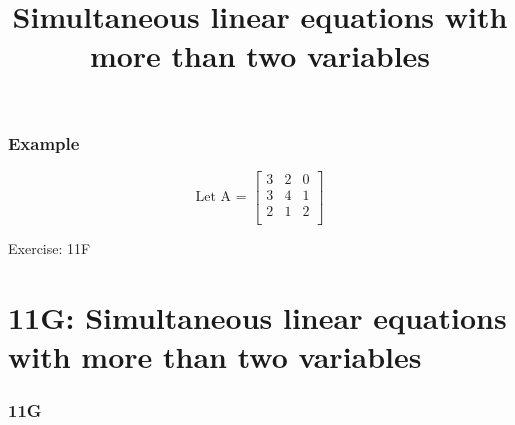 \documentclass[
	11pt, %
]{beamer}
\begin{document}
\begin{frame}    
\end{frame}
\begin{frame}[t]
    \frametitle{Example}
    \[
        \text{Let A = }
        \begin{bmatrix}
            3 & 2 & 0\\
            3 & 4 & 1\\
            2 & 1 & 2\\
        \end{bmatrix}
    \]
\end{frame}
\begin{frame}
\end{frame}
\begin{frame}{Exercise: 11F}
\end{frame}
\section{11G: Simultaneous linear equations with more than two variables}
\begin{frame}
    \frametitle{11G}
    \begin{center}
        \title{Simultaneous linear equations with more than two variables}
        \maketitle
    \end{center}
\end{frame}
\end{document}

